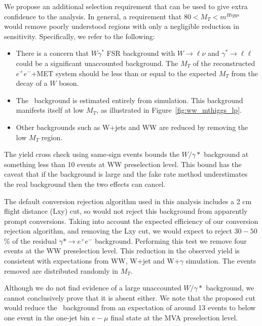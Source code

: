 We propose an additional selection requirement that can
be used to give extra confidence to the analysis. In general, a
requirement that $80 < M_T < m^{Higgs}$ would remove poorly understood
regions with only a negligible reduction in sensitivity.
Specifically, we refer to the following:

\begin{itemize}
    \item There is a concern that $W\gamma^*$ FSR background with
      $W\rightarrow \ell\nu$ and $\gamma^*\rightarrow\ell\ell$ could be
      a significant unaccounted background.  The $M_T$ of the
      reconstructed $e^{+}e^{-}$+MET system should be less than or
      equal to the expected $M_T$ from the decay of a $W$ boson.
    \item The \dytt~background is estimated entirely from simulation.
      This background manifests itself at low $M_T$, as illustrated in
      Figure~\ref{fig:ww_mthiggs_lp}.
    \item Other backgrounds such as W+jets and WW are reduced by
      removing the low $M_T$ region.
\end{itemize}

The yield cross check using same-sign events bounds the $W/\gamma*$ background
at something less than 10 events at WW preselection level.
This bound has the caveat that if the background is large and the
fake rate method understimates the real background then the two
effects can cancel.

The default conversion rejection algorithm used in this analysis
includes a 2 cm flight distance (Lxy) cut, so would not reject this background
from apparently prompt conversions.
Taking into account the expected efficiency of our conversion
rejection algorithm, and removing the Lxy cut,
we would expect to reject $30-50$\% of the residual
$\gamma*\rightarrow e^{+}e^{-}$ background.
Performing this test we remove four events at the WW preselection level.
This reduction in the observed yield is consistent with expectations
from WW, W+jet and W+$\gamma$ simulation.
The events removed are distributed randomly in $M_T$.

Although we do not find evidence of a large unaccounted $W/\gamma*$ background,
we cannot conclusively prove that it is absent either.
We note that the proposed cut would reduce the \dytt~background from an expectation
of around 13 events to below one event in the one-jet bin $e-\mu$ final state at
the MVA preselection level.

